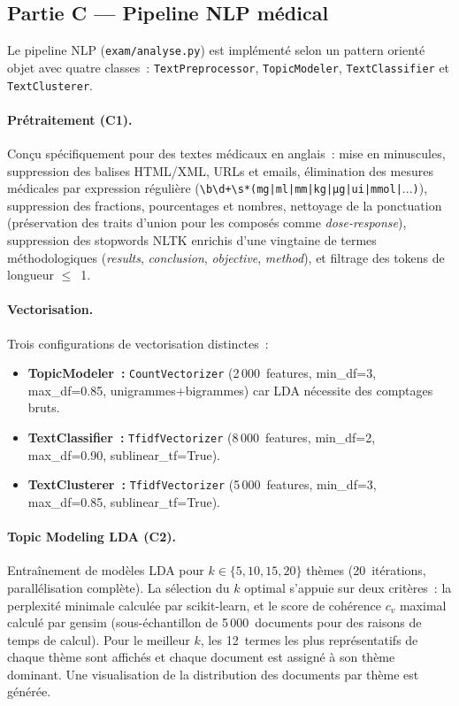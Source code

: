 \documentclass[11pt, a4paper, oneside]{article}
\begin{document}
\subsection{Partie C — Pipeline NLP médical}

Le pipeline NLP (\texttt{exam/analyse.py}) est implémenté selon un pattern orienté objet avec quatre classes~: \texttt{TextPreprocessor}, \texttt{TopicModeler}, \texttt{TextClassifier} et \texttt{TextClusterer}.

\paragraph{Prétraitement (C1).} Conçu spécifiquement pour des textes médicaux en anglais~: mise en minuscules, suppression des balises HTML/XML, URLs et emails, élimination des mesures médicales par expression régulière (\texttt{\textbackslash b\textbackslash d+\textbackslash s*(mg|ml|mm|kg|μg|ui|mmol|}...\texttt{)}), suppression des fractions, pourcentages et nombres, nettoyage de la ponctuation (préservation des traits d'union pour les composés comme \emph{dose-response}), suppression des stopwords NLTK enrichis d'une vingtaine de termes méthodologiques (\emph{results}, \emph{conclusion}, \emph{objective}, \emph{method}), et filtrage des tokens de longueur $\le$~1.

\paragraph{Vectorisation.} Trois configurations de vectorisation distinctes~:
\begin{itemize}[noitemsep]
  \item \textbf{TopicModeler~:} \texttt{CountVectorizer} (2\,000~features, min\_df=3, max\_df=0.85, unigrammes+bigrammes) car LDA nécessite des comptages bruts.
  \item \textbf{TextClassifier~:} \texttt{TfidfVectorizer} (8\,000~features, min\_df=2, max\_df=0.90, sublinear\_tf=True).
  \item \textbf{TextClusterer~:} \texttt{TfidfVectorizer} (5\,000~features, min\_df=3, max\_df=0.85, sublinear\_tf=True).
\end{itemize}

\paragraph{Topic Modeling LDA (C2).} Entraînement de modèles LDA pour $k \in \{5, 10, 15, 20\}$ thèmes (20~itérations, parallélisation complète). La sélection du $k$ optimal s'appuie sur deux critères~: la perplexité minimale calculée par scikit-learn, et le score de cohérence $c_v$ maximal calculé par gensim (sous-échantillon de 5\,000~documents pour des raisons de temps de calcul). Pour le meilleur $k$, les 12~termes les plus représentatifs de chaque thème sont affichés et chaque document est assigné à son thème dominant. Une visualisation de la distribution des documents par thème est générée.
\end{document}
